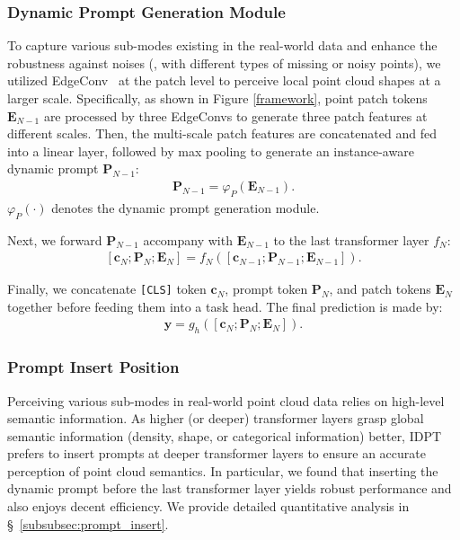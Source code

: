 \documentclass[10pt,twocolumn,letterpaper]{article}
\begin{document}
\subsubsection{Dynamic Prompt Generation Module}
To capture various sub-modes existing in the real-world data and enhance the robustness against noises (\eg, with different types of missing or noisy points), we utilized EdgeConv~\cite{wang2019dynamic} at the patch level to perceive local point cloud shapes at a larger scale. 
Specifically, as shown in Figure \ref{framework}, point patch tokens $\bm E_{N-1}$ are processed by three EdgeConvs to generate three patch features at different scales. 
Then, the multi-scale patch features are concatenated and fed into a linear layer, followed by max pooling to generate an instance-aware dynamic prompt ${\bm P_{N-1}}$:
\begin{gather}
    \label{eq9}
    {\bm P_{N-1}} = \varphi_P(\bm E_{N-1}).
\end{gather}
$\varphi_P(\cdot)$ denotes the dynamic prompt generation module. 

Next, we forward ${\bm P_{N-1}}$ accompany with $\bm E_{N-1}$ to the last transformer layer $f_N$: 
\begin{gather}
    \label{eq10}
    [\bm c_N; {\bm P_N}; \bm E_N] = f_N([\bm c_{N-1}; {\bm P_{N-1}}; \bm E_{N-1}]).
\end{gather}

Finally, we concatenate \texttt{[CLS]} token $\bm c_{N}$, prompt token ${\bm P_{N}}$, and patch tokens $\bm E_{N}$ together before feeding them into a task head. 
The final prediction is made by:
\begin{gather}
    \label{eq11}
    \bm y = g_h([\bm c_N; {\bm P_N}; \bm E_N]).
\end{gather}

\subsubsection{Prompt Insert Position}
Perceiving various sub-modes in real-world point cloud data relies on high-level semantic information. 
As higher (or deeper) transformer layers grasp global semantic information (\eg density, shape, or categorical information) better, IDPT prefers to insert prompts at deeper transformer layers to ensure an accurate perception of point cloud semantics. In particular, we found that inserting the dynamic prompt before the last transformer layer yields robust performance and also enjoys decent efficiency. We provide detailed quantitative analysis in \S~\ref{subsubsec:prompt_insert}.
\end{document}
